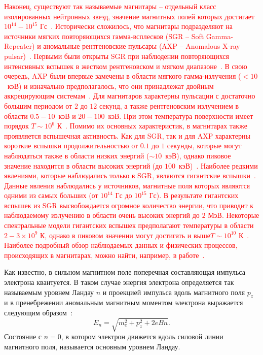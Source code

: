 \textcolor{red}{Наконец, существуют так называемые магнитары -- отдельный класс изолированных нейтронных звезд, значение магнитных полей которых достигает $10^{14} - 10^{15}$ Гс~\cite{Mitrofanov:1982,Duncan:1992,Thompson:1995,Thompson:1996,DongLai:2001,Lyutikov:2002}. Исторически сложилось, что магнитары подразделяют на источники мягких повторяющихся гамма-всплесков (SGR -- Soft Gamma-Repeater) и аномальные рентгеновские пульсары (AXP -- Anomalous \linebreak X-ray pulsar)~\cite{Kouveliotou:1998ze,Kouveliotou:1998fd,Gavriil:2002mc,Ibrahim:2002zw,Ibrahim:2002zy,Olausen:2014,vanParad:1995}. Первыми были открыты SGR при наблюдении повторяющихся интенсивных вспышек в жестком рентгеновском и мягком диапазоне~\cite{Mazets:1979}. В свою очередь, AXP были впервые замечены в области мягкого гамма-излучения ($<10$~кэВ) и изначально предполагалось, что они принадлежат двойным аккрецирующим системам~\cite{Mereghetti:1995}. Для магнитаров характерны пульсации с достаточно большим периодом от $2$ до $12$ секунд, а также рентгеновским излучением в области $0.5 - 10$~кэВ и $20 - 100$~кэВ. При этом температура поверхности имеет порядок $T\sim 10^6$ К~\cite{Yakovlev:2004}. Помимо их основных характеристик, в магнитарах также проявляется вспышечная активность. Как для SGR, так и для AXP характерны короткие вспышки продолжительностью от $0.1$  до $1$ секунды, которые могут наблюдаться также в области низких энергий ($\sim 10$~кэВ), однако пиковое значение находится в области высоких энергий (до $100$~кэВ)~\cite{Younes:2021}. Наиболее редкими явлениями, которые наблюдались только в SGR, являются гигантские вспышки~\cite{Mazets:1979,Hurley:1999,Hurley:1999b,Hurley:2005}. Данные явления наблюдались у источников, магнитные поля которых являются одними из самых больших (от $10^{14}$ Гс до $10^{15}$ Гс).  В результате гигантских вспышек из SGR высвобождается огромное количество энергии, что приводит к наблюдаемому излучению в области очень высоких энергий до $2$ МэВ. Некоторые спектральные модели гигантских вспышек предполагают температуры в области \mbox{$2-3\times 10^9$} К, однако в пиковом значении могут достигать и выше\linebreak $T\sim 10^{10}$ К~\cite{Hurley:1999}. Наиболее подробный обзор наблюдаемых данных и физических процессов, происходящих в магнитарах, можно найти, например, в работе~\cite{Kaspi:2017}. }

Как известно, в сильном магнитном поле поперечная составляющая импульса электрона квантуется. В таком случае энергия электрона определяется так называемым уровнем Ландау $n$ и проекцией импульса вдоль магнитного поля $p_z$ и в пренебрежении аномальным магнитным моментом электрона выражается следующим образом~\cite{Sokolov:1968}: 
\begin{equation}
E_n = \sqrt{m_e^2+p_z^2+2 e B n}.
\end{equation}
%
Состояние с $n = 0$, в котором электрон движется вдоль силовой линии магнитного поля, называется основным уровнем Ландау.

